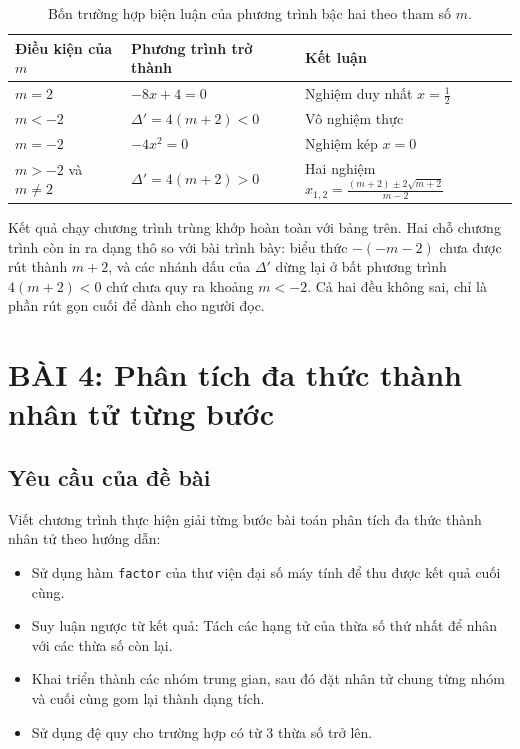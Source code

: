 \documentclass[12pt,a4paper]{article}
\begin{document}
\begin{table}[h!]
\centering
\begin{tabular}{|l|l|l|}
\hline
\textbf{Điều kiện của $m$} & \textbf{Phương trình trở thành} & \textbf{Kết luận} \\
\hline
$m = 2$ & $-8x + 4 = 0$ & Nghiệm duy nhất $x = \frac{1}{2}$ \\
\hline
$m < -2$ & $\Delta' = 4(m+2) < 0$ & Vô nghiệm thực \\
\hline
$m = -2$ & $-4x^2 = 0$ & Nghiệm kép $x = 0$ \\
\hline
$m > -2$ và $m \ne 2$ & $\Delta' = 4(m+2) > 0$ & Hai nghiệm $x_{1,2} = \frac{(m+2) \pm 2\sqrt{m+2}}{m-2}$ \\
\hline
\end{tabular}
\caption{Bốn trường hợp biện luận của phương trình bậc hai theo tham số $m$.}
\end{table}

Kết quả chạy chương trình trùng khớp hoàn toàn với bảng trên. Hai chỗ chương trình còn in ra dạng thô so với bài trình bày: biểu thức $-(-m-2)$ chưa được rút thành $m+2$, và các nhánh dấu của $\Delta'$ dừng lại ở bất phương trình $4(m+2) < 0$ chứ chưa quy ra khoảng $m < -2$. Cả hai đều không sai, chỉ là phần rút gọn cuối để dành cho người đọc.

\newpage
\section{BÀI 4: Phân tích đa thức thành nhân tử từng bước}

\subsection{Yêu cầu của đề bài}
Viết chương trình thực hiện giải từng bước bài toán phân tích đa thức thành nhân tử theo hướng dẫn:
\begin{itemize}
    \item Sử dụng hàm \texttt{factor} của thư viện đại số máy tính để thu được kết quả cuối cùng.
    \item Suy luận ngược từ kết quả: Tách các hạng tử của thừa số thứ nhất để nhân với các thừa số còn lại.
    \item Khai triển thành các nhóm trung gian, sau đó đặt nhân tử chung từng nhóm và cuối cùng gom lại thành dạng tích.
    \item Sử dụng đệ quy cho trường hợp có từ 3 thừa số trở lên.
\end{itemize}
\end{document}

